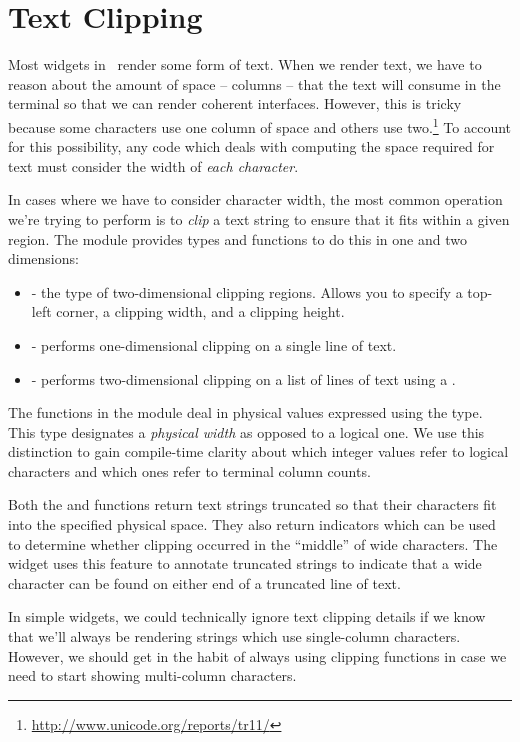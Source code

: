 \section{Text Clipping}
\label{sec:textclip}

Most widgets in \vtyui\ render some form of text.  When we render
text, we have to reason about the amount of space -- columns -- that
the text will consume in the terminal so that we can render coherent
interfaces.  However, this is tricky because some characters use one
column of space and others use
two.\footnote{\url{http://www.unicode.org/reports/tr11/}} To account
for this possibility, any code which deals with computing the space
required for text must consider the width of \textit{each character}.

In cases where we have to consider character width, the most common
operation we're trying to perform is to \textit{clip} a text string to
ensure that it fits within a given region.  The  module
provides types and functions to do this in one and two dimensions:

\begin{itemize}
\item {} - the type of two-dimensional clipping regions.
  Allows you to specify a top-left corner, a clipping width, and a
  clipping height.
\item {} - performs one-dimensional clipping on a single line
  of text.
\item {} - performs two-dimensional clipping on a list of
  lines of text using a .
\end{itemize}

The functions in the  module deal in physical values
expressed using the  type.  This type designates a
\textit{physical width} as opposed to a logical one.  We use this
distinction to gain compile-time clarity about which integer values
refer to logical characters and which ones refer to terminal column
counts.

Both the  and  functions return text strings
truncated so that their characters fit into the specified physical
space.  They also return  indicators which can be used to
determine whether clipping occurred in the ``middle'' of wide
characters.  The  widget uses this feature to annotate
truncated strings to indicate that a wide character can be found on
either end of a truncated line of text.

In simple widgets, we could technically ignore text clipping details
if we know that we'll always be rendering strings which use
single-column characters.  However, we should get in the habit of
always using clipping functions in case we need to start showing
multi-column characters.
